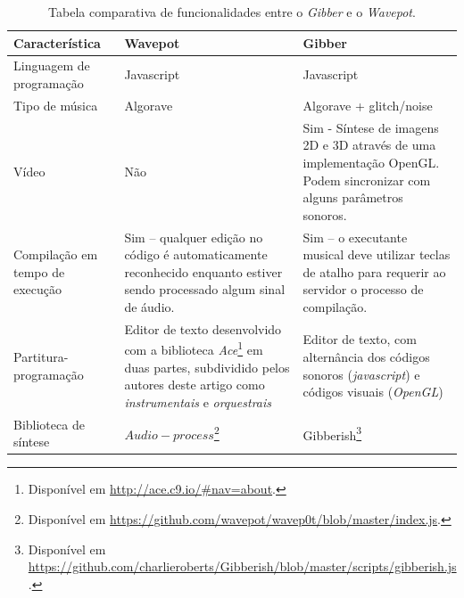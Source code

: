 \renewcommand{\arraystretch}{1.35} %

\begin{table}[ht!]
\caption{Tabela comparativa de funcionalidades entre o \emph{Gibber} e o \emph{Wavepot}.}
    \begin{tabular}{ p{4cm} | p{5cm} | p{5cm}}
    \hline 
    \hline 
    \textbf{Característica}      & \textbf{Wavepot}  & \textbf{Gibber} \\
    \hline 
    \hline 
    
    Linguagem de programação & Javascript & Javascript \\
    \hline
    
    Tipo de música      & Algorave & Algorave + glitch/noise\\
    \hline
    
    Vídeo               & Não      & \small Sim - Síntese de imagens 2D e 3D através de uma implementação OpenGL. Podem sincronizar com alguns parâmetros sonoros.    \\
    \hline
    
    Compilação em tempo de execução & \small Sim -- qualquer edição no código é automaticamente reconhecido enquanto estiver sendo processado algum sinal de áudio. & \small Sim -- o executante musical deve utilizar teclas de atalho para requerir ao servidor o processo de compilação. \\
    \hline
    
    Partitura-programação      & \small Editor de texto desenvolvido com a biblioteca \emph{Ace}\footnotemark \footnote{Disponível em \url{http://ace.c9.io/#nav=about}.} em duas partes, subdividido pelos autores deste artigo como \emph{instrumentais} e \emph{orquestrais}  & \small Editor de texto, com alternância dos códigos sonoros (\emph{javascript}) e códigos visuais (\emph{OpenGL}) \\
    \hline

    Biblioteca de síntese  & 
    $Audio-process$\footnote{Disponível em \url{https://github.com/wavepot/wavep0t/blob/master/index.js}.} & 
    Gibberish\footnote{Disponível em \url{https://github.com/charlieroberts/Gibberish/blob/master/scripts/gibberish.js}.}    \\
    \hline
    

\end{tabular}
\end{table}
